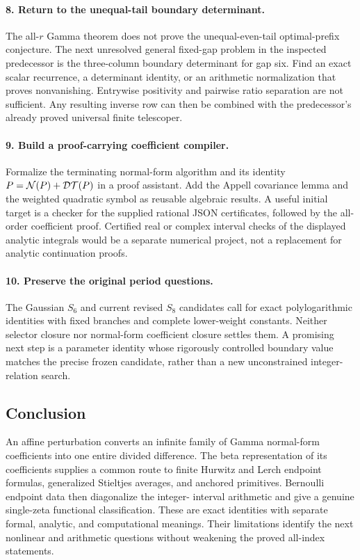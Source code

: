 \paragraph{8. Return to the unequal-tail boundary determinant.}
The all-$r$ Gamma theorem does not prove the unequal-even-tail
optimal-prefix conjecture. The next unresolved general fixed-gap
problem in the inspected predecessor is the three-column boundary
determinant for gap six. Find an exact scalar recurrence, a determinant
identity, or an arithmetic normalization that proves nonvanishing.
Entrywise positivity and pairwise ratio separation are not sufficient.
Any resulting inverse row can then be combined with the predecessor's
already proved universal finite telescoper.

\paragraph{9. Build a proof-carrying coefficient compiler.}
Formalize the terminating normal-form algorithm and its identity
$P=\mathcal N(P)+\mathcal D\mathcal T(P)$ in a proof assistant. Add the Appell covariance
lemma and the weighted quadratic symbol as reusable algebraic results.
A useful initial target is a checker for the supplied rational JSON
certificates, followed by the all-order coefficient proof. Certified
real or complex interval checks of the displayed analytic integrals
would be a separate numerical project, not a replacement for analytic
continuation proofs.

\paragraph{10. Preserve the original period questions.}
The Gaussian $S_6$ and current revised $S_8$ candidates call for exact
polylogarithmic identities with fixed branches and complete lower-weight
constants. Neither selector closure nor normal-form coefficient
closure settles them. A promising next step is a parameter identity
whose rigorously controlled boundary value matches the precise frozen
candidate, rather than a new unconstrained integer-relation search.

\subsection*{Conclusion}
An affine perturbation converts an infinite family of Gamma normal-form
coefficients into one entire divided difference. The beta representation
of its coefficients supplies a common route to finite Hurwitz and Lerch
endpoint formulas, generalized Stieltjes averages, and anchored
primitives. Bernoulli endpoint data then diagonalize the integer-
interval arithmetic and give a genuine single-zeta functional
classification. These are exact identities with separate formal,
analytic, and computational meanings. Their limitations identify the
next nonlinear and arithmetic questions without weakening the proved
all-index statements.
